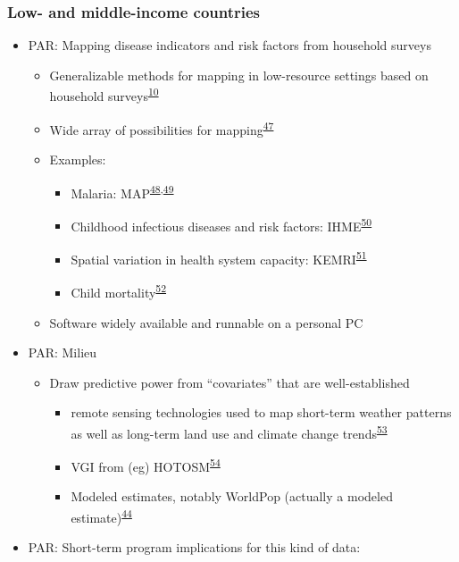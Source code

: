 \documentclass[
]{article}
\providecommand{\tightlist}{%
  \setlength{\itemsep}{0pt}\setlength{\parskip}{0pt}}
\begin{document}
\hypertarget{low--and-middle-income-countries}{%
\subsubsection{Low- and middle-income countries}\label{low--and-middle-income-countries}}

\begin{itemize}
\tightlist
\item
  PAR: Mapping disease indicators and risk factors from household surveys

  \begin{itemize}
  \tightlist
  \item
    Generalizable methods for mapping in low-resource settings based on household surveys\textsuperscript{\protect\hyperlink{ref-Diggle2016}{10}}
  \item
    Wide array of possibilities for mapping\textsuperscript{\protect\hyperlink{ref-Pigott2015}{47}}
  \item
    Examples:

    \begin{itemize}
    \tightlist
    \item
      Malaria: MAP\textsuperscript{\protect\hyperlink{ref-Weiss2019}{48},\protect\hyperlink{ref-Nguyen2019}{49}}
    \item
      Childhood infectious diseases and risk factors: IHME\textsuperscript{\protect\hyperlink{ref-Osgood-Zimmerman2018}{50}}
    \item
      Spatial variation in health system capacity: KEMRI\textsuperscript{\protect\hyperlink{ref-Maina2019}{51}}
    \item
      Child mortality\textsuperscript{\protect\hyperlink{ref-Wakefield2020}{52}}
    \end{itemize}
  \item
    Software widely available and runnable on a personal PC
  \end{itemize}
\item
  PAR: Milieu

  \begin{itemize}
  \tightlist
  \item
    Draw predictive power from ``covariates'' that are well-established

    \begin{itemize}
    \tightlist
    \item
      remote sensing technologies used to map short-term weather patterns as well as long-term land use and climate change trends\textsuperscript{\protect\hyperlink{ref-Ericksen2011}{53}}
    \item
      VGI from (eg) HOTOSM\textsuperscript{\protect\hyperlink{ref-Thomson2019}{54}}
    \item
      Modeled estimates, notably WorldPop (actually a modeled estimate)\textsuperscript{\protect\hyperlink{ref-Tatem2017}{44}}
    \end{itemize}
  \end{itemize}
\item
  PAR: Short-term program implications for this kind of data:


\end{itemize}
\end{document}
